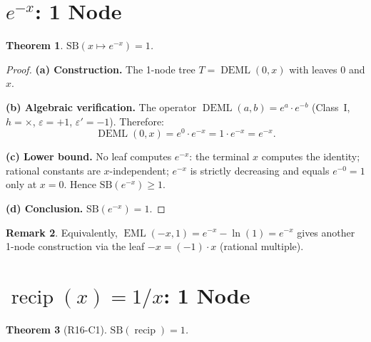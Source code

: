 \documentclass[12pt,a4paper]{article}
\newtheorem{theorem}{Theorem}[section]
\theoremstyle{definition}
\newtheorem{remark}[theorem]{Remark}
\newcommand{\EML}{\operatorname{EML}}
\newcommand{\DEML}{\operatorname{DEML}}
\newcommand{\recip}{\operatorname{recip}}
\newcommand{\SB}{\mathrm{SB}}
\begin{document}
\section{\texorpdfstring{$e^{-x}$}{exp(-x)}: 1 Node}
\label{sec:enx}

\begin{theorem}
\label{thm:enx}
$\SB(x \mapsto e^{-x}) = 1$.
\end{theorem}

\begin{proof}
\textbf{(a) Construction.}
The 1-node tree $T = \DEML(0,x)$ with leaves $0$ and $x$.

\textbf{(b) Algebraic verification.}
The operator $\DEML(a,b) = e^a \cdot e^{-b}$ (Class~I, $h=\times$, $\varepsilon=+1$, $\varepsilon'=-1$).
Therefore:
\[
  \DEML(0,x) = e^0 \cdot e^{-x} = 1 \cdot e^{-x} = e^{-x}.
\]

\textbf{(c) Lower bound.}
No leaf computes $e^{-x}$: the terminal $x$ computes the identity;
rational constants are $x$-independent; $e^{-x}$ is strictly decreasing
and equals $e^{-0}=1$ only at $x=0$.  Hence $\SB(e^{-x}) \ge 1$.

\textbf{(d) Conclusion.} $\SB(e^{-x}) = 1$.
\end{proof}

\begin{remark}
Equivalently, $\EML(-x,1) = e^{-x} - \ln(1) = e^{-x}$ gives another
1-node construction via the leaf $-x = (-1)\cdot x$ (rational multiple).
\end{remark}

\section{\texorpdfstring{$\recip(x) = 1/x$}{recip(x)}: 1 Node}
\label{sec:recip}

\begin{theorem}[R16-C1]
\label{thm:recip}
$\SB(\recip) = 1$.
\end{theorem}
\end{document}
